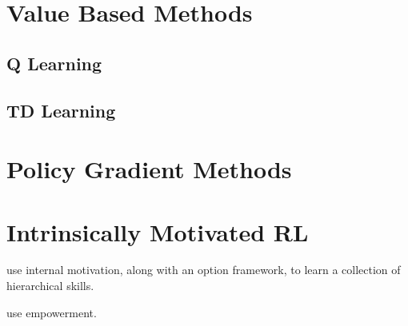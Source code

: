\section{Value Based Methods}

\subsection{Q Learning}

\subsection{TD Learning}


\section{Policy Gradient Methods}


\section{Intrinsically Motivated RL}

\cite{barto2004intrinsically} use internal motivation, along with an option framework, to learn a collection of hierarchical skills.
\newline

\noindent \cite{mohamed2015variational} use empowerment.

